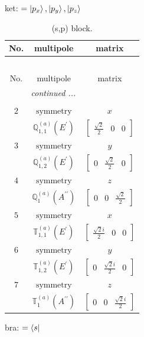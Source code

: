 \documentclass[fleqn,8pt,landscape]{jsarticle}
\begin{document}
\noindent
ket: $=\ket{p_{x}}, \ket{p_{y}}, \ket{p_{z}}$
\renewcommand{\arraystretch}{1.6}
\begin{longtable}{ccc}
\caption{(s,p) block.}
 \\
 \hline \hline
No. & multipole & matrix \\ \hline \endfirsthead

\multicolumn{2}{l}{\tablename\ \thetable{}} \\
 \hline \hline
No. & multipole & matrix \\ \hline \endhead

 \hline \hline
\multicolumn{2}{r}{\footnotesize\it continued ...} \\ \endfoot

 \hline \hline
\multicolumn{2}{r}{} \\ \endlastfoot

$ 2 $ & $ \text{symmetry} $ & $ x $ \\
$  $ & $ \mathbb{Q}_{1,1}^{(a)}(E^{\prime}) $ & $ \begin{bmatrix} \frac{\sqrt{2}}{2} & 0 & 0 \end{bmatrix} $ \\ \hline
$ 3 $ & $ \text{symmetry} $ & $ y $ \\
$  $ & $ \mathbb{Q}_{1,2}^{(a)}(E^{\prime}) $ & $ \begin{bmatrix} 0 & \frac{\sqrt{2}}{2} & 0 \end{bmatrix} $ \\ \hline
$ 4 $ & $ \text{symmetry} $ & $ z $ \\
$  $ & $ \mathbb{Q}_{1}^{(a)}(A^{\prime\prime}) $ & $ \begin{bmatrix} 0 & 0 & \frac{\sqrt{2}}{2} \end{bmatrix} $ \\ \hline
$ 5 $ & $ \text{symmetry} $ & $ x $ \\
$  $ & $ \mathbb{T}_{1,1}^{(a)}(E^{\prime}) $ & $ \begin{bmatrix} \frac{\sqrt{2} i}{2} & 0 & 0 \end{bmatrix} $ \\ \hline
$ 6 $ & $ \text{symmetry} $ & $ y $ \\
$  $ & $ \mathbb{T}_{1,2}^{(a)}(E^{\prime}) $ & $ \begin{bmatrix} 0 & \frac{\sqrt{2} i}{2} & 0 \end{bmatrix} $ \\ \hline
$ 7 $ & $ \text{symmetry} $ & $ z $ \\
$  $ & $ \mathbb{T}_{1}^{(a)}(A^{\prime\prime}) $ & $ \begin{bmatrix} 0 & 0 & \frac{\sqrt{2} i}{2} \end{bmatrix} $ \\ \hline
\end{longtable}
bra: $=\bra{s}$
\end{document}
